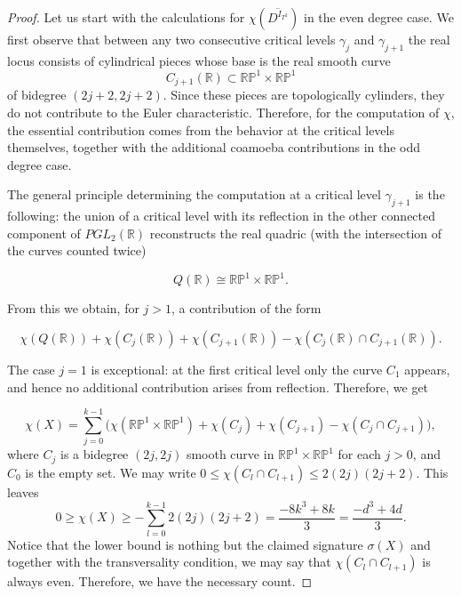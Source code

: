 \documentclass[pdflatex,sn-mathphys-num]{sn-jnl}%
\theoremstyle{thmstyleone}%
\theoremstyle{thmstyletwo}%
\theoremstyle{thmstylethree}%
\begin{document}
\begin{proof}
	Let us start with the calculations for $\chi(\overline{D^{I_{T^2}}})$ in the even degree case. We first observe that between any two consecutive critical levels $\gamma_j$ and $\gamma_{j+1}$ the real locus consists of cylindrical pieces whose base is the real smooth curve 
	\[
	C_{j+1}(\mathbb{R}) \subset \mathbb{RP}^1 \times \mathbb{RP}^1
	\]
	of bidegree $(2j+2,2j+2)$. Since these pieces are topologically cylinders, they do not contribute to the Euler characteristic. Therefore, for the computation of $\chi$, the essential contribution comes from the behavior at the critical levels themselves, together with the additional coamoeba contributions in the odd degree case.
	
	The general principle determining the computation at a critical level $\gamma_{j+1}$ is the following: the union of a critical level with its reflection in the other connected component of $PGL_2(\mathbb{R})$ reconstructs the real quadric (with the intersection of the curves counted twice)
	
	$$Q(\mathbb{R}) \cong \mathbb{RP}^1 \times \mathbb{RP}^1.$$
	
	From this we obtain, for $j>1$, a contribution of the form
	
	$$\chi\!\left(Q(\mathbb{R})\right)
	+\chi\!\left(C_j(\mathbb{R})\right)
	+\chi\!\left(C_{j+1}(\mathbb{R})\right)
	-\chi\!\left(C_j(\mathbb{R}) \cap C_{j+1}(\mathbb{R})\right).$$
	
	The case $j=1$ is exceptional: at the first critical level only the curve $C_1$ appears, and hence no additional contribution arises from reflection.
	Therefore, we get 
	
	$$\chi(X)=\sum_{j=0}^{k-1}\big(\chi(\mathbb{RP}^1\times\mathbb{RP}^1)+\chi(C_j)+\chi(C_{j+1})-\chi(C_j\cap C_{j+1})\big),$$
	where $C_j$ is a bidegree $(2j,2j)$ smooth curve in $\mathbb{RP}^1\times\mathbb{RP}^1$ for each $j>0$, and $C_0$ is the empty set. We may write $0\leq\chi(C_l\cap C_{l+1})\leq 2(2j)(2j+2)$. This leaves 
	$$0\geq \chi(X)\geq -\sum_{l=0}^{k-1}2(2j)(2j+2)=\dfrac{-8k^3+8k}{3}=\dfrac{-d^3+4d}{3}.$$	
	Notice that the lower bound is nothing but the claimed signature $\sigma(X)$ and together with the transversality condition, we may say that $\chi(C_l\cap C_{l+1})$ is always even. Therefore, we have the necessary count. 
	

\end{proof}
\end{document}

